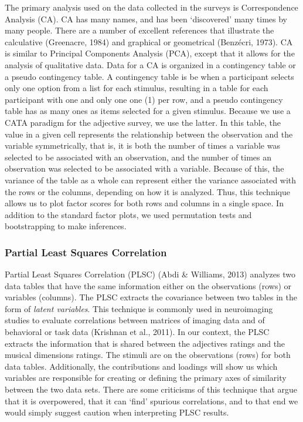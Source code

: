 \documentclass[
  english,
  man,floatsintext]{apa6}
\begin{document}
The primary analysis used on the data collected in the surveys is Correspondence Analysis (CA). CA has many names, and has been `discovered' many times by many people. There are a number of excellent references that illustrate the calculative (Greenacre, 1984) and graphical or geometrical (Benzécri, 1973). CA is similar to Principal Components Analysis (PCA), except that it allows for the analysis of qualitative data. Data for a CA is organized in a contingency table or a pseudo contingency table. A contingency table is be when a participant selects only one option from a list for each stimulus, resulting in a table for each participant with one and only one one (1) per row, and a pseudo contingency table has as many ones as items selected for a given stimulus. Because we use a CATA paradigm for the adjective survey, we use the latter. In this table, the value in a given cell represents the relationship between the observation and the variable symmetrically, that is, it is both the number of times a variable was selected to be associated with an observation, and the number of times an observation was selected to be associated with a variable. Because of this, the variance of the table as a whole can represent either the variance associated with the rows or the columns, depending on how it is analyzed. Thus, this technique allows us to plot factor scores for both rows and columns in a single space. In addition to the standard factor plots, we used permutation tests and bootstrapping to make inferences.

\hypertarget{partial-least-squares-correlation}{%
\subsubsection{Partial Least Squares Correlation}\label{partial-least-squares-correlation}}

Partial Least Squares Correlation (PLSC) (Abdi \& Williams, 2013) analyzes two data tables that have the same information either on the observations (rows) or variables (columns). The PLSC extracts the covariance between two tables in the form of \emph{latent variables}. This technique is commonly used in neuroimaging studies to evaluate correlations between matrices of imaging data and of behavioral or task data (Krishnan et al., 2011). In our context, the PLSC extracts the information that is shared between the adjectives ratings and the musical dimensions ratings. The stimuli are on the observations (rows) for both data tables. Additionally, the contributions and loadings will show us which variables are responsible for creating or defining the primary axes of similarity between the two data sets. There are some criticisms of this technique that argue that it is overpowered, that it can `find' spurious correlations, and to that end we would simply suggest caution when interpreting PLSC results.
\end{document}
